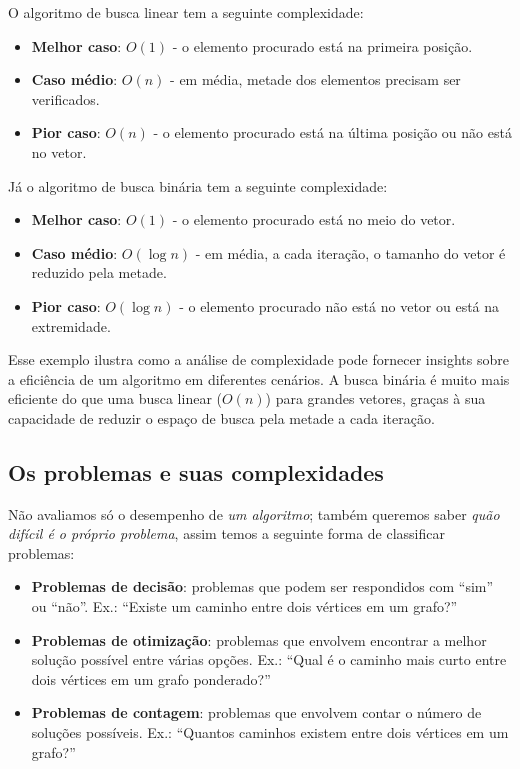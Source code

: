 O algoritmo de busca linear tem a seguinte complexidade:
\begin{itemize}\setlength{\itemsep}{2pt}
	\item \textbf{Melhor caso}: \(O(1)\) - o elemento procurado está na primeira posição.
	\item \textbf{Caso médio}: \(O(n)\) - em média, metade dos elementos precisam ser verificados.
	\item \textbf{Pior caso}: \(O(n)\) - o elemento procurado está na última posição ou não está no vetor.
\end{itemize}

Já o algoritmo de busca binária tem a seguinte complexidade:
\begin{itemize}\setlength{\itemsep}{2pt}
	\item \textbf{Melhor caso}: \(O(1)\) - o elemento procurado está no meio do vetor.
	\item \textbf{Caso médio}: \(O(\log n)\) - em média, a cada iteração, o tamanho do vetor é reduzido pela metade.
	\item \textbf{Pior caso}: \(O(\log n)\) - o elemento procurado não está no vetor ou está na extremidade.
\end{itemize}


Esse exemplo ilustra como a análise de complexidade pode fornecer insights sobre a eficiência de um algoritmo em diferentes cenários. A busca binária é muito mais eficiente do que uma busca linear (\(O(n)\)) para grandes vetores, graças à sua capacidade de reduzir o espaço de busca pela metade a cada iteração.

\subsection{Os problemas e suas complexidades}

Não avaliamos só o desempenho de \emph{um algoritmo}; também queremos saber \emph{quão difícil é o próprio problema}, assim temos  a seguinte forma de classificar problemas:
\begin{itemize}\setlength{\itemsep}{2pt}
	\item \textbf{Problemas de decisão}: problemas que podem ser respondidos com ``sim'' ou ``não''. Ex.: ``Existe um caminho entre dois vértices em um grafo?''
	\item \textbf{Problemas de otimização}: problemas que envolvem encontrar a melhor solução possível entre várias opções. Ex.: ``Qual é o caminho mais curto entre dois vértices em um grafo ponderado?''
	\item \textbf{Problemas de contagem}: problemas que envolvem contar o número de soluções possíveis. Ex.: ``Quantos caminhos existem entre dois vértices em um grafo?''
\end{itemize}


